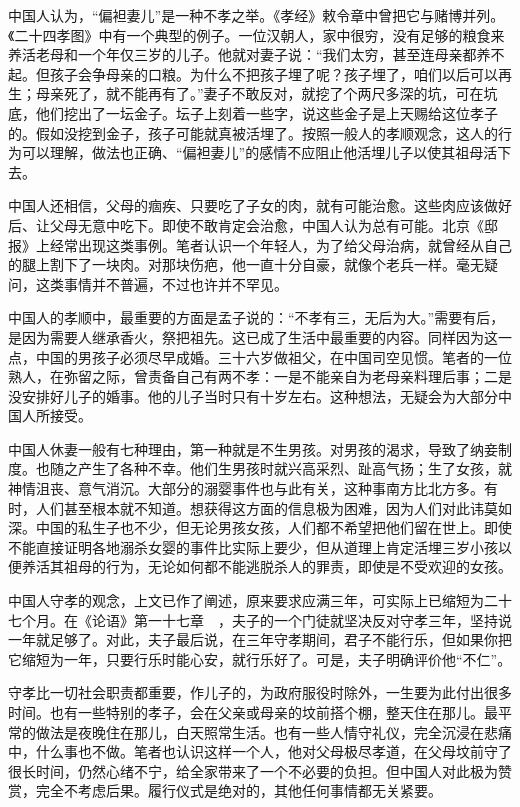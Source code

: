\documentclass[12pt,oneside]{book}
\begin{document}
\begin{common-format}
中国人认为，“偏袒妻儿”是一种不孝之举。《孝经》敕令章中曾把它与赌博并列。《二十四孝图》中有一个典型的例子。一位汉朝人，家中很穷，没有足够的粮食来养活老母和一个年仅三岁的儿子。他就对妻子说：“我们太穷，甚至连母亲都养不起。但孩子会争母亲的口粮。为什么不把孩子埋了呢？孩子埋了，咱们以后可以再生；母亲死了，就不能再有了。”妻子不敢反对，就挖了个两尺多深的坑，可在坑底，他们挖出了一坛金子。坛子上刻着一些字，说这些金子是上天赐给这位孝子的。假如没挖到金子，孩子可能就真被活埋了。按照一般人的孝顺观念，这人的行为可以理解，做法也正确、“偏袒妻儿”的感情不应阻止他活埋儿子以使其祖母活下去。 

中国人还相信，父母的痼疾、只要吃了子女的肉，就有可能治愈。这些肉应该做好后、让父母无意中吃下。即使不敢肯定会治愈，中国人认为总有可能。北京《邸报》上经常出现这类事例。笔者认识一个年轻人，为了给父母治病，就曾经从自己的腿上割下了一块肉。对那块伤疤，他一直十分自豪，就像个老兵一样。毫无疑问，这类事情并不普遍，不过也许并不罕见。 

中国人的孝顺中，最重要的方面是孟子说的：“不孝有三，无后为大。”需要有后，是因为需要人继承香火，祭把祖先。这已成了生活中最重要的内容。同样因为这一点，中国的男孩子必须尽早成婚。三十六岁做祖父，在中国司空见惯。笔者的一位熟人，在弥留之际，曾责备自己有两不孝：一是不能亲自为老母亲料理后事；二是没安排好儿子的婚事。他的儿子当时只有十岁左右。这种想法，无疑会为大部分中国人所接受。 

中国人休妻一般有七种理由，第一种就是不生男孩。对男孩的渴求，导致了纳妾制度。也随之产生了各种不幸。他们生男孩时就兴高采烈、趾高气扬；生了女孩，就神情沮丧、意气消沉。大部分的溺婴事件也与此有关，这种事南方比北方多。有时，人们甚至根本就不知道。想获得这方面的信息极为困难，因为人们对此讳莫如深。中国的私生子也不少，但无论男孩女孩，人们都不希望把他们留在世上。即使不能直接证明各地溺杀女婴的事件比实际上要少，但从道理上肯定活埋三岁小孩以便养活其祖母的行为，无论如何都不能逃脱杀人的罪责，即使是不受欢迎的女孩。 

中国人守孝的观念，上文已作了阐述，原来要求应满三年，可实际上已缩短为二十七个月。在《论语》第一十七章　，夫子的一个门徒就坚决反对守孝三年，坚持说一年就足够了。对此，夫子最后说，在三年守孝期间，君子不能行乐，但如果你把它缩短为一年，只要行乐时能心安，就行乐好了。可是，夫子明确评价他“不仁”。 

守孝比一切社会职责都重要，作儿子的，为政府服役时除外，一生要为此付出很多时间。也有一些特别的孝子，会在父亲或母亲的坟前搭个棚，整天住在那儿。最平常的做法是夜晚住在那儿，白天照常生活。也有一些人情守礼仪，完全沉浸在悲痛中，什么事也不做。笔者也认识这样一个人，他对父母极尽孝道，在父母坟前守了很长时间，仍然心绪不宁，给全家带来了一个不必要的负担。但中国人对此极为赞赏，完全不考虑后果。履行仪式是绝对的，其他任何事情都无关紧要。 


\end{common-format}
\end{document}
